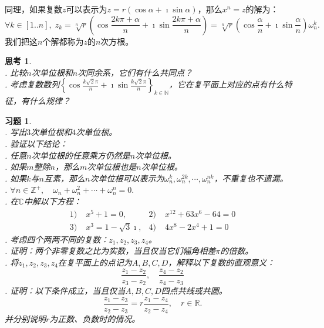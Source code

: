 \documentclass[12pt,UTF8]{ctexbook}
\theoremstyle{definition}
\theoremstyle{plain}
\newtheorem{sk}{思考}[section]
\newtheorem{xt}{习题}[section]
\begin{document}
同理，如果复数$z$可以表示为$z = r(\cos{\alpha} + \imath \sin{\alpha})$，那么$x^n = z$的解为：
$$ \forall k\in  [1..n], \; z_k = \sqrt[n]{r}\left(\cos{\frac{2k\pi + \alpha}{n}} + \imath \sin{\frac{2k\pi + \alpha}{n}}\right) = \sqrt[n]{r}\left(\cos{\frac{\alpha}{n}} + \imath \sin{\frac{\alpha}{n}}\right)\omega_n^k. $$
我们把这$n$个解都称为$z$的$n$次方根。

\begin{sk}
    \mbox{} \\
    . 比较$n$次单位根和$n$次同余系，它们有什么共同点？\\
    . 考虑复数数列$\displaystyle\left\{\cos{\frac{k\sqrt{2}\pi}{n}} + \imath \sin{\frac{k\sqrt{2}\pi}{n}} \right\}_{k\in\mathbb{N}}$，它在复平面上对应的点有什么特征，有什么规律？
\end{sk}

\begin{xt}
    \mbox{} \\
    . 写出$3$次单位根和$4$次单位根。 \\
    . 验证以下结论：\\
    . 任意$n$次单位根的任意乘方仍然是$n$次单位根。\\
    . 如果$m$整除$n$，那么$m$次单位根也是$n$次单位根。\\
    . 如果$k$与$n$互素，那么$n$次单位根可以表示为$\omega_n^k, \omega_n^{2k}, \cdots , \omega_n^{nk}$，不重复也不遗漏。\\
    . $ \forall n\in\mathbb{Z}^+, \quad \omega_n + \omega_n^2 + \cdots + \omega_n^n = 0. $\\
    . 在$\mathbb{C}$中解以下方程：
    \begin{align*}
        1)\;& x^5 + 1 = 0,  & 2)\;& x^{12} + 63x^6 - 64 = 0 \\
        3)\;& x^3 = 1 - \sqrt{3}\imath,  & 4)\;& 4x^8 - 2x^4 + 1 = 0 
    \end{align*}
    . 考虑四个两两不同的复数：$z_1,z_2,z_3,z_4$。\\
    . 证明：两个非零复数之比为实数，当且仅当它们幅角相差$\pi$的倍数。\\
    . 将$z_1,z_2,z_3,z_4$在复平面上的点记为$A,B,C,D$，解释以下复数的直观意义：
    $$ \frac{z_1 - z_2}{z_3 - z_2}, \quad \frac{z_4 - z_2}{z_4 - z_3}  $$
    . 证明：以下条件成立，当且仅当$A,B,C,D$四点共线或共圆。
    $$ \frac{z_1 - z_3}{z_2 - z_3} = r \frac{z_1 - z_4}{z_2 - z_4}, \quad r\in \mathbb{R}. $$
    \indent 并分别说明$r$为正数、负数时的情况。

\end{xt}
\end{document}
